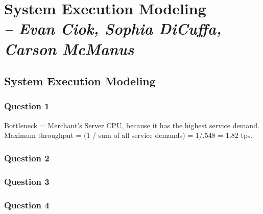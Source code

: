 \chapter{System Execution Modeling \\
  \small{\textit{-- Evan Ciok, Sophia DiCuffa, Carson McManus}}
  \label{Chapter::LabThree}}


\section{System Execution Modeling \label{Section::LabThree}}

\subsection{Question 1}
Bottleneck = Merchant’s Server CPU, because it has the highest service demand.
Maximum throughput = (1 / sum of all service demands) = 1/.548 = 1.82 tps.

\subsection{Question 2}

\subsection{Question 3}

\subsection{Question 4}
